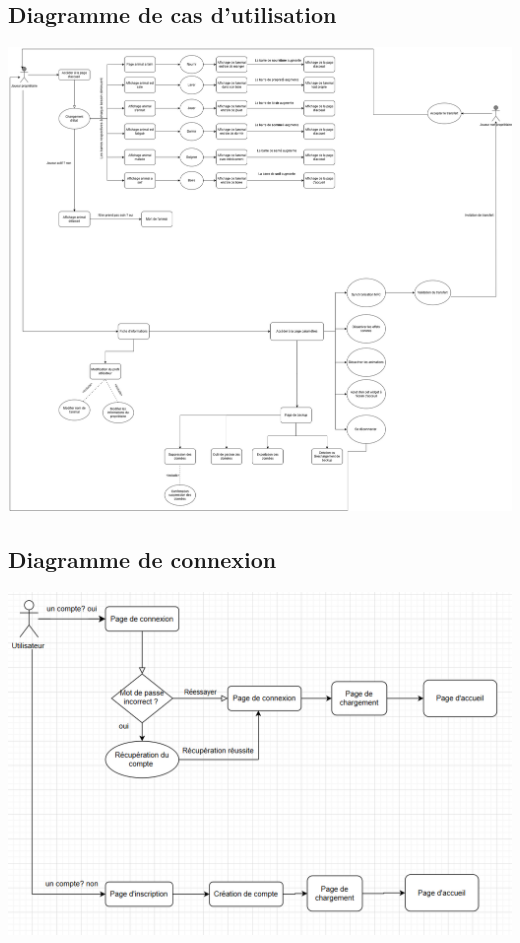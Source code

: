 \documentclass{conception_detaillee}
\begin{document}
\begin{itemize}[label=\textbullet]
\section{Diagramme de cas d'utilisation}
\noindent\includegraphics[width=0.8\paperwidth, height=0.8\paperheight]{images/utilisation.png}
\subsection{Diagramme de connexion}
\noindent\includegraphics[width=0.8\paperwidth]{images/connexion.png}

\end{itemize}
\end{document}
